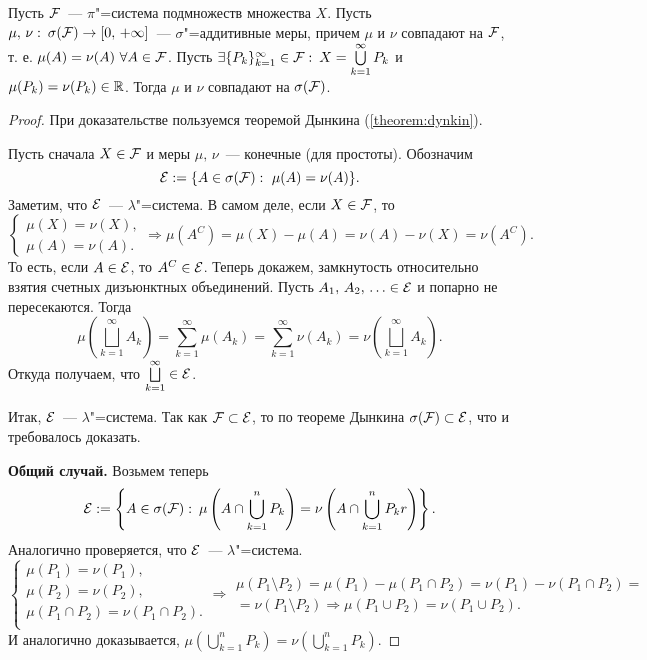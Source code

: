 \begin{theorem}
    Пусть $\mathcal{F} $~--- $\pi$"=система подмножеств множества $X$. Пусть $\mu,\, \nu:\:
        \sigma(\mathcal{F} )\to[0,\, +\infty]$~--- $\sigma$"=аддитивные меры, причем $\mu$ и $\nu$
    совпадают на $\mathcal{F} $, т. е. $\mu(A)=\nu(A)\ \forall A\in\mathcal{F} $.
    Пусть $\exists \{P_k\}_{k=1}^{\infty}\in\mathcal{F} :\: X=\bigcup\limits_{k=1}^{\infty}P_k$ и
    $\mu(P_k)=\nu(P_k)\in\mathbb{R}$. Тогда $\mu$ и $\nu$ совпадают на $\sigma(\mathcal{F} )$.

    \begin{proof}
        При доказательстве пользуемся теоремой Дынкина (\ref{theorem:dynkin}).

        Пусть сначала $X\in\mathcal{F} $ и меры $\mu,\, \nu$~--- конечные (для простоты).
        Обозначим
        \[
            \mathcal{E} := \{A\in\sigma(\mathcal{F} ):\ \mu(A)=\nu(A)\}.
        \]
        Заметим, что $\mathcal{E}$~--- $\lambda$"=система. В самом деле, если $X\in\mathcal{F} $, то
        \[
            \begin{cases}
                \mu(X)=\nu(X), \\
                \mu(A)=\nu(A).
            \end{cases}\Rightarrow\mu(A^C)=\mu(X)-\mu(A)=\nu(A)-\nu(X)=\nu(A^C).
        \]
        То есть, если $A\in\mathcal{E}$, то $A^C\in\mathcal{E}$. Теперь докажем, замкнутость относительно взятия
        счетных дизъюнктных объединений. Пусть $A_1,\,A_2,\,\ldots\in\mathcal{E}$ и попарно
        не пересекаются. Тогда \[
            \mu\left(\bigsqcup_{k=1}^{\infty}A_k\right)=\sum_{k=1}^{\infty}\mu(A_k)=
            \sum_{k=1}^{\infty}\nu(A_k)=\nu\left(\bigsqcup_{k=1}^{\infty}A_k\right).
        \]
        Откуда получаем, что $\bigsqcup\limits_{k=1}^{\infty}\in\mathcal{E}$.

        Итак, $\mathcal{E}$~--- $\lambda$"=система. Так как $\mathcal{F} \subset\mathcal{E}$, то по теореме Дынкина
        $\sigma(\mathcal{F} )\subset \mathcal{E}$, что и требовалось доказать.

        \textbf{Общий случай.} Возьмем теперь
        \[
            \mathcal{E}:=\left\{A\in\sigma(\mathcal{F} ):\: \mu\left(A\cap\bigcup_{k=1}^{n}P_k\right)=
            \nu\left(A\cap\bigcup_{k=1}^{n}P_kr\right)\right\}.
        \]
        Аналогично проверяется, что $\mathcal{E}$~--- $\lambda$"=система.
        \[
            \begin{cases}
                \mu(P_1)=\nu(P_1),                 \\
                \mu(P_2)=\nu(P_2),                 \\
                \mu(P_1\cap P_2)=\nu(P_1\cap P_2). \\
            \end{cases}\Rightarrow \begin{array}{l}
                \mu(P_1\setminus P_2)   =\mu(P_1)-\mu(P_1\cap P_2)=\nu(P_1)-\nu(P_1\cap P_2)= \\
                =\nu(P_1\setminus P_2)\Rightarrow\mu(P_1\cup P_2)=\nu(P_1\cup P_2).
            \end{array}
        \]
        И аналогично доказывается, $\mu\left(\bigcup\limits_{k=1}^n P_k\right)=
            \nu\left(\bigcup\limits_{k=1}^n P_k\right)$.


\end{proof}
\end{theorem}
